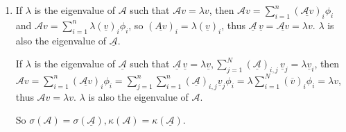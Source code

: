 \documentclass{article}
\begin{document}
\begin{enumerate}[1.]
    \item If $\lambda$ is the eigenvalue of $\mathcal{A}$ such that $\mathcal{A}v=\lambda v$, then
          $\mathcal{A}v=\sum_{i=1}^n (\underline{\mathcal{A}v})_i\phi_i$ and $\mathcal{A}v=\sum_{i=1}^n \lambda(\underline{v})_i\phi_i$, so $(\underline{Av})_i=\lambda(\underline{v})_i$, thus $\underline{\mathcal{A}}\,\underline{v}=\underline{\mathcal{A}v}=\lambda v$.
          $\lambda$ is also the eigenvalue of $\underline{\mathcal{A}}$.

          If $\lambda$ is the eigenvalue of $\underline{\mathcal{A}}$ such that $\underline{\mathcal{A}}\,\underline{v}=\lambda \underline{v},
              \sum_{j=1}^N(\underline{\mathcal{A}})_{i,j}\,\underline{v}_j=\lambda \underline{v}_i$, then
          $\mathcal{A}v=\sum_{i=1}^n (\underline{\mathcal{A}v})_i\phi_i=\sum_{j=1}^n\sum_{i=1}^n (\underline{\mathcal{A}})_{i,j}\underline{v}_j\phi_i=\lambda\sum_{i=1}^N(\overline{v})_i\phi_i=\lambda v$,
          thus $\mathcal{A}v=\lambda v$.
          $\lambda$ is also the eigenvalue of ${\mathcal{A}}$.

          So $\sigma(\mathcal{A})=\sigma(\underline{\mathcal{A}}),\kappa(\mathcal{A})=\kappa(\underline{\mathcal{A}}).$


\end{enumerate}
\end{document}
